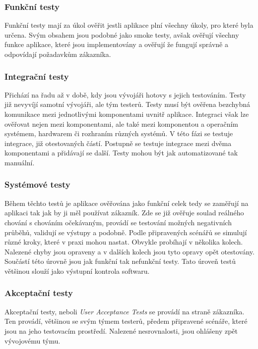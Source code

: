 \documentclass[czech,DP]{thesiskiv}
\begin{document}
\subsubsection*{Funkční testy}
Funkční testy mají za úkol ověřit jestli aplikace plní všechny úkoly, pro které byla určena. Svým obsahem jsou podobné jako smoke testy, avšak ověřují všechny funkce aplikace, které jsou implementovány a ověřují že fungují správně a odpovídají požadavkům zákazníka.  \citep{jorgensen2016software} 

\subsubsection*{Integrační testy}
Přichází na řadu až v době, kdy jsou vývojáři hotovy s jejich testováním. Testy již nevyvíjí samotní vývojáři, ale tým testerů. Testy musí být ověřena bezchybná komunikace mezi jednotlivými komponentami uvnitř aplikace. Integraci však lze ověřovat nejen mezi komponentami, ale také mezi komponentou a operačním systémem, hardwarem či rozhraním různých systémů. V této fázi se testuje integrace, již otestovaných částí. Postupně se testuje integrace mezi dvěma komponentami a přidávají se další. Testy mohou být jak automatizované tak manuální.

\subsubsection*{Systémové testy}
Během těchto testů je aplikace ověřována jako funkční celek tedy se zaměřují na aplikaci tak jak by ji měl používat zákazník. Zde se již ověřuje soulad reálného chování s chováním očekávaným, provádí se testování možných negativních průběhů, validují se výstupy a podobně. Podle připravených scénářů se simulují různé kroky, které v praxi mohou nastat. Obvykle probíhají v několika kolech. Nalezené chyby jsou opraveny a v dalších kolech jsou tyto opravy opět otestovány. Součástí této úrovně jsou jak funkční tak nefunkční testy. Tato úroveň testů většinou slouží jako výstupní kontrola softwaru.

\subsubsection*{Akceptační testy}
Akceptační testy, neboli \textit{User Acceptance Tests} se provádí na straně zákazníka. Ten provádí, většinou se svým týmem testerů, předem připravené scénáře, které jsou na jeho testovacím prostředí. Nalezené nesrovnalosti, jsou ohlášeny zpět vývojovému týmu.  
\end{document}
